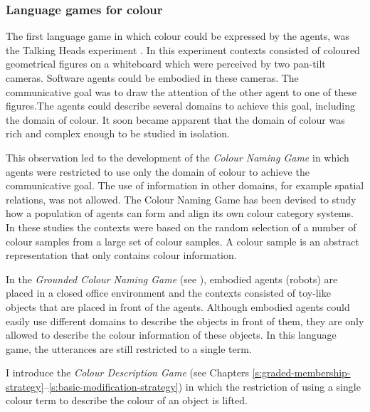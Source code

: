 \subsubsection{Language games for colour}
\label{s:language-games-for-colour}

The first language game in which colour could be expressed by the
agents, was the Talking Heads experiment
\citep{steels99talking}. In this experiment contexts consisted
of coloured geometrical figures on a whiteboard which were perceived
by two pan-tilt cameras. Software agents could be embodied in these
cameras. The communicative goal was to draw the attention of the other
agent to one of these figures.The agents could describe several
domains to achieve this goal, including the domain of colour. It soon
became apparent that the domain of colour was rich and complex enough
to be studied in isolation.

This observation led to the development of the \emph{Colour Naming
  Game} \citep{steels05coordinating,
  belpaeme05explaining, belpaeme07language, puglisi08cultural,
  baronchelli10modeling} in which agents were restricted to use only
the domain of colour to achieve the communicative goal. The use of
information in other domains, for example spatial relations, was not
allowed. The Colour Naming Game has been devised to study how a
population of agents can form and align its own colour category
systems. In these studies the contexts were based on the random
selection of a number of colour samples from a large set of
colour samples. A colour sample is an abstract representation that
only contains colour information.

In the \emph{Grounded Colour Naming Game} (see ),
embodied agents (ro\-bots) are placed in a closed office environment and
the contexts consisted of toy-like objects that are placed in front of
the agents. Although embodied agents could easily use different
domains to describe the objects in front of them, they are only
allowed to describe the colour information of these objects. In this
language game, the utterances are still restricted to a single term.

I introduce the \emph{Colour Description Game} (see Chapters
\ref{s:graded-membership-strategy}--\ref{s:basic-modification-strategy})
in which the restriction of using a single colour term to describe the
colour of an object is lifted.

